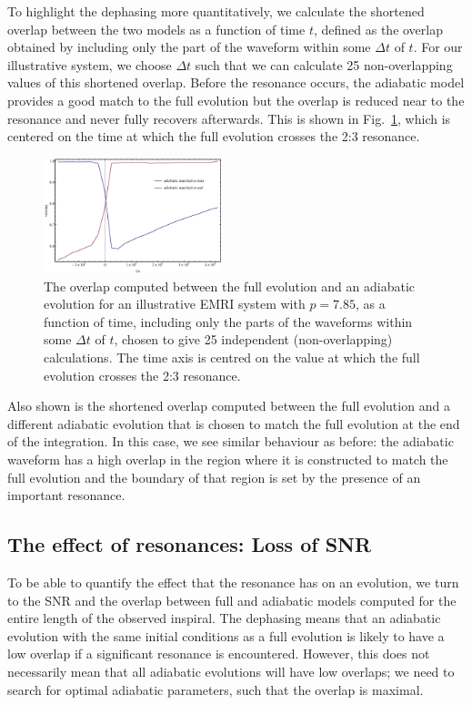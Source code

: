 \documentclass[aps,prd,amsfonts,amssymb,amsmath,nofootinbib,reprint,showpacs,superscriptaddress,twocolumn]{revtex4}
\newcommand{\figref}[1]{Fig.\ \ref{fig:#1}}
\begin{document}
To highlight the dephasing more quantitatively, we calculate the shortened overlap between the two models as a function of time $t$, defined as the overlap obtained by including only the part of the waveform within some $\Delta t$ of $t$. For our illustrative system, we choose $\Delta t$ such that we can calculate 25 non-overlapping values of this shortened overlap. Before the resonance occurs, the adiabatic model provides a good match to the full evolution but the overlap is reduced near to the resonance and never fully recovers afterwards. This is shown in \figref{overlap-dephasing}, which is centered on the time at which the full evolution crosses the 2:3 resonance.

\begin{figure}[htbp]
\centering
\includegraphics[width=0.46\textwidth]{Fig_overlap_vs_time}
\caption{\label{fig:overlap-dephasing}The overlap computed between the full evolution and an adiabatic evolution for an illustrative EMRI system with $p=7.85$, as a function of time, including only the parts of the waveforms within some $\Delta t$ of $t$, chosen to give 25 independent (non-overlapping) calculations. The time axis is centred on the value at which the full evolution crosses the 2:3 resonance.}
\end{figure}

Also shown is the shortened overlap computed between the full evolution and a different adiabatic evolution that is chosen to match the full evolution at the end of the integration. In this case, we see similar behaviour as before: the adiabatic waveform has a high overlap in the region where it is constructed to match the full evolution and the boundary of that region is set by the presence of an important resonance.

\subsection{The effect of resonances: Loss of SNR}
\label{sec:SNRloss}

To be able to quantify the effect that the resonance has on an evolution, we turn to the SNR and the overlap between full and adiabatic models computed for the entire length of the observed inspiral. The dephasing means that an adiabatic evolution with the same initial conditions as a full evolution is likely to have a low overlap if a significant resonance is encountered. However, this does not necessarily mean that all adiabatic evolutions will have low overlaps; we need to search for optimal adiabatic parameters, such that the overlap is maximal.
\end{document}
